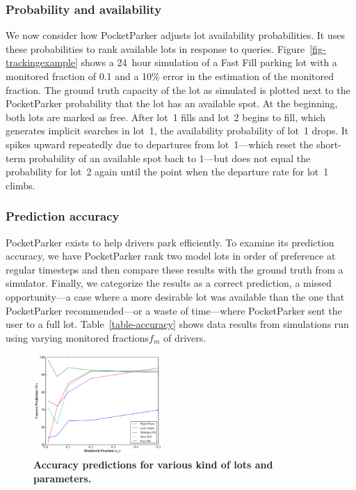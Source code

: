 \subsubsection{Probability and availability}

We now consider how PocketParker adjusts lot availability probabilities.  It
uses these probabilities to rank available lots in response to queries.
Figure~\ref{fig-trackingexample} shows a 24~hour simulation of a Fast Fill
parking lot with a monitored fraction of 0.1 and a 10\% error in the
estimation of the monitored fraction. The ground truth capacity of the lot as
simulated is plotted next to the PocketParker probability that the lot has an
available spot. At the beginning, both lots are marked as free. After lot~1
fills and lot~2 begins to fill, which generates implicit searches
in lot~1, the availability probability of lot~1 drops. It spikes upward
repeatedly due to departures from lot~1---which reset the short-term
probability of an available spot back to 1---but does not equal the
probability for lot~2 again until the point when the departure rate for lot~1
climbs.

\subsubsection{Prediction accuracy}




PocketParker exists to help drivers park efficiently.  To examine its
prediction accuracy, we have PocketParker rank two model lots in order of
preference at regular timesteps and then compare these results with the ground
truth from a simulator.  Finally, we categorize the results as a correct
prediction, a missed opportunity---a case where a more desirable lot was
available than the one that PocketParker recommended---or a waste of
time---where PocketParker sent the user to a full lot.
Table~\ref{table-accuracy} shows data results from simulations run using
varying monitored fractions$f_m$ of drivers.

\begin{figure}[t]
\centering
\includegraphics[height=1.5in,width=\columnwidth]{./simulator/figures/accuracy_graph.pdf}

\caption{\textbf{Accuracy predictions for various kind of lots and parameters.}}
\label{fig-accuracy}
\vspace*{-0.25in}
\end{figure}

